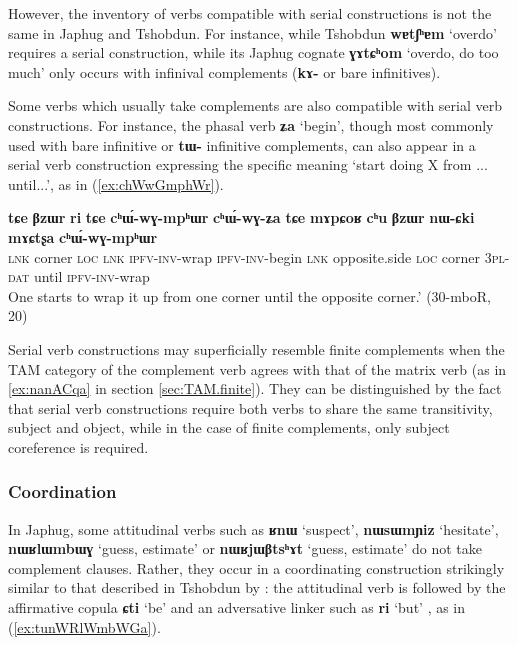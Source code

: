 \documentclass[oneside,a4paper,11pt]{article}
\newcommand{\ipa}[1]{\textbf{\phon#1}} %
\newcommand{\jpg}[2]{\ipa{#1} `#2'} %
\begin{document}
However, the inventory of verbs compatible with serial constructions is not the same in Japhug and Tshobdun. For instance, while Tshobdun \jpg{wɐtʃʰɐm}{overdo} requires a serial construction, while its Japhug cognate \jpg{ɣɤtɕʰom}{overdo, do too much}  only occurs with infinival complements (\ipa{kɤ-} or bare infinitives).

Some verbs which usually take complements are also compatible with serial verb constructions. 
 For instance, the phasal verb \jpg{ʑa}{begin}, though most commonly used with bare infinitive or \ipa{tɯ-} infinitive complements, can also appear in a serial verb construction expressing the specific meaning `start doing X from ... until...', as in (\ref{ex:chWwGmphWr}).

   \begin{exe}
\ex \label{ex:chWwGmphWr}
 \gll  \ipa{tɕe} 	\ipa{βzɯr} 	\ipa{ri} 	\ipa{tɕe} 	\ipa{cʰɯ́-wɣ-mpʰɯr} 	\ipa{cʰɯ́-wɣ-ʑa} 	\ipa{tɕe} 	\ipa{mɤpɕoʁ} 	\ipa{cʰu} 	\ipa{βzɯr} 	\ipa{nɯ-ɕki} 	\ipa{mɤɕtʂa} 	\ipa{cʰɯ́-wɣ-mpʰɯr}  \\
 \textsc{lnk} corner \textsc{loc} \textsc{lnk} \textsc{ipfv-inv-}wrap \textsc{ipfv-inv-}begin \textsc{lnk}  opposite.side \textsc{loc} corner \textsc{3pl-dat} until \textsc{ipfv-inv-}wrap  \\
 \glt  One starts to wrap it up from one corner until the opposite corner.' (30-mboR, 20)
\end{exe}
 
Serial verb constructions may superficially resemble finite complements when the TAM category of the complement verb agrees with that of the matrix verb (as in \ref{ex:nanACqa} in section \ref{sec:TAM.finite}). They can be distinguished by the fact that serial verb constructions require both verbs to share the same transitivity, subject and object, while in the case of finite complements, only subject coreference is required.

\subsubsection{Coordination}
In Japhug, some attitudinal verbs such as \jpg{ʁnɯ}{suspect}, \jpg{nɯsɯmɲiz}{hesitate}, \jpg{nɯʁlɯmbɯɣ}{guess, estimate} or \jpg{nɯʁjɯβtsʰɤt}{guess, estimate} do not take complement clauses. Rather, they occur in a coordinating construction strikingly similar to that described in Tshobdun  by \citet[487-8]{sun12complementation}: the attitudinal verb is followed by the affirmative copula \jpg{ɕti}{be} and an adversative linker such as \jpg{ri}{but} , as in (\ref{ex:tunWRlWmbWGa}).
\end{document}
